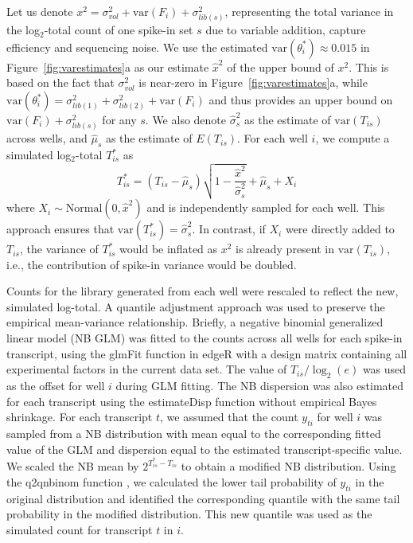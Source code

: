 \documentclass{article}
\newcommand\variance{\mbox{var}}
\begin{document}
Let us denote $x^2 = \sigma^2_{vol} + \variance(F_i) + \sigma^2_{lib(s)}$, representing the total variance in the log$_2$-total count of one spike-in set $s$ due to variable addition, capture efficiency and sequencing noise.
We use the estimated $\variance(\theta^*_i) \approx 0.015$ in Figure~\ref{fig:varestimates}a as our estimate $\hat{x}^2$ of the upper bound of $x^2$.
This is based on the fact that $\sigma^2_{vol}$ is near-zero in Figure~\ref{fig:varestimates}a, while $\variance(\theta^*_i) = \sigma^2_{lib(1)} + \sigma^2_{lib(2)} + \variance(F_i)$ and thus provides an upper bound on $\variance(F_i) + \sigma^2_{lib(s)}$ for any $s$.
We also denote $\hat\sigma^2_s$ as the estimate of $\variance(T_{is})$ across wells, and $\hat\mu_s$ as the estimate of $E(T_{is})$.
For each well $i$, we compute a simulated log$_2$-total $T^*_{is}$ as
\[
    T^*_{is} = (T_{is} - \hat\mu_s)\sqrt{1-\frac{ \hat{x}^2}{\hat\sigma^2_s}} + \hat\mu_s + X_i
\]
where $X_i \sim \mbox{Normal}(0, \hat{x}^2)$ and is independently sampled for each well.
This approach ensures that $\variance(T^*_{is}) = \hat\sigma^2_s$.
In contrast, if $X_i$ were directly added to $T_{is}$, the variance of $T^*_{is}$ would be inflated as $x^2$ is already present in $\variance(T_{is})$, i.e., the contribution of spike-in variance would be doubled.

Counts for the library generated from each well were rescaled to reflect the new, simulated log-total.
A quantile adjustment approach was used to preserve the empirical mean-variance relationship.
Briefly, a negative binomial generalized linear model (NB GLM) was fitted to the counts across all wells for each spike-in transcript, using the glmFit function in edgeR \autocite{mccarthy2012differential, robinson2010edgeR} with a design matrix containing all experimental factors in the current data set.
The value of $T_{is}/\log_2(e)$ was used as the offset for well $i$ during GLM fitting.
The NB dispersion was also estimated for each transcript using the estimateDisp function without empirical Bayes shrinkage.
For each transcript $t$, we assumed that the count $y_{ti}$ for well $i$ was sampled from a NB distribution with mean equal to the corresponding fitted value of the GLM and dispersion equal to the estimated transcript-specific value.
We scaled the NB mean by $2^{T^*_{is} - T_{is}}$ to obtain a modified NB distribution.
Using the q2qnbinom function \autocite{robinson2008small}, we calculated the lower tail probability of $y_{ti}$ in the original distribution and identified the corresponding quantile with the same tail probability in the modified distribution.
This new quantile was used as the simulated count for transcript $t$ in $i$.
\end{document}
